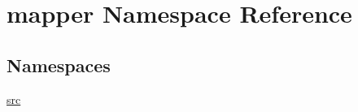 \hypertarget{namespacemapper}{}\section{mapper Namespace Reference}
\label{namespacemapper}
\subsection*{Namespaces}
\begin{DoxyCompactItemize}
\item 
 \hyperlink{namespacemapper_1_1src}{src}
\end{DoxyCompactItemize}
